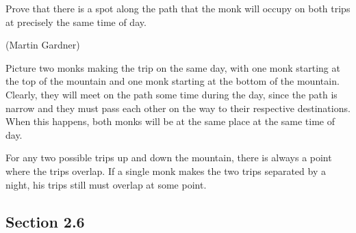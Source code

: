 \documentclass[letterpaper, landscape]{exam}
\begin{document}
\begin{questions}
      Prove that there is a spot along the path that the monk will occupy on both trips at precisely the same time of day.

      (Martin Gardner)

      \begin{solution}
        Picture two monks making the trip on the same day, with one monk starting at the top of the mountain and one monk
        starting at the bottom of the mountain.  Clearly, they will meet on the path some time during the day, since the
        path is narrow and they must pass each other on the way to their respective destinations.  When this happens, both
        monks will be at the same place at the same time of day.  

        For any two possible trips up and down the mountain, there is always a point where the trips overlap.  If a
        single monk makes the two trips separated by a night, his trips still must overlap at some point.

      \end{solution}

  \end{questions}

  \ifprintanswers{}

      \subsection{Section 2.6} 
\end{document}
